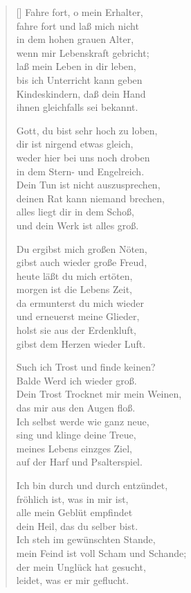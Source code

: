\begin{multicols}{2}
\begin{verse}[\versewidth]
 Fahre fort, o mein Erhalter,\\
fahre fort und laß mich nicht\\
in dem hohen grauen Alter,\\
wenn mir Lebenskraft gebricht;\\
laß mein Leben in dir leben,\\
bis ich Unterricht kann geben\\
Kindeskindern, daß dein Hand\\
ihnen gleichfalls sei bekannt.

 Gott, du bist sehr hoch zu loben,\\
dir ist nirgend etwas gleich,\\
weder hier bei uns noch droben\\
in dem Stern- und Engelreich.\\
Dein Tun ist nicht auszusprechen,\\
deinen Rat kann niemand brechen,\\
alles liegt dir in dem Schoß,\\
und dein Werk ist alles groß.

 Du ergibst mich großen Nöten,\\
gibst auch wieder große Freud,\\
heute läßt du mich ertöten,\\
morgen ist die Lebens Zeit,\\
da ermunterst du mich wieder\\
und erneuerst meine Glieder,\\
holst sie aus der Erdenkluft,\\
gibst dem Herzen wieder Luft.

 Such ich Trost und finde keinen?\\
Balde Werd ich wieder groß.\\
Dein Trost Trocknet mir mein Weinen,\\
das mir aus den Augen floß.\\
Ich selbst werde wie ganz neue,\\
sing und klinge deine Treue,\\
meines Lebens einzges Ziel,\\
auf der Harf und Psalterspiel.

 Ich bin durch und durch entzündet,\\
fröhlich ist, was in mir ist,\\
alle mein Geblüt empfindet\\
dein Heil, das du selber bist.\\
Ich steh im gewünschten Stande,\\
mein Feind ist voll Scham und Schande;\\
der mein Unglück hat gesucht,\\
leidet, was er mir geflucht.

\end{verse}
\end{multicols}
